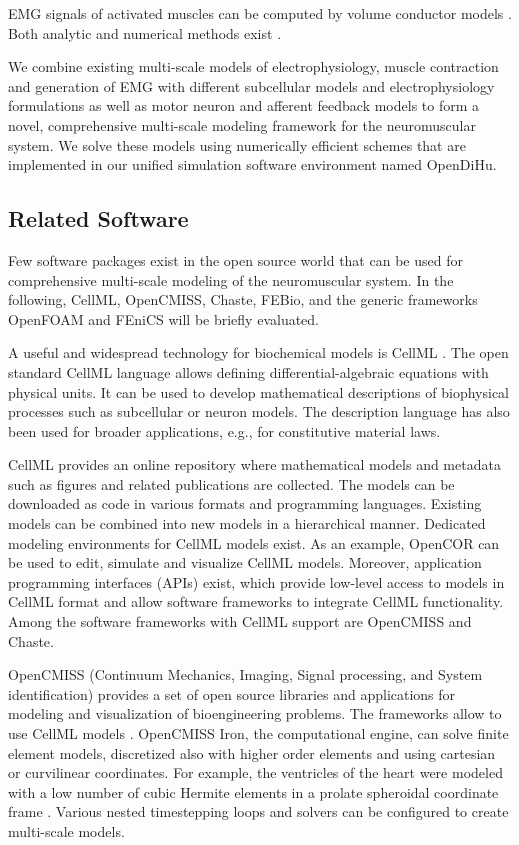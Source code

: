 EMG signals of activated muscles can be computed by volume conductor models \cite{Mesin2013}. Both 
 analytic \cite{Dimitrov1998, Farina2001, Mesin2006} and numerical methods exist \cite{Lowery2002, Mordhorst2015, Mordhorst2017, Klotz2020}.

We combine existing multi-scale models of electrophysiology, muscle contraction and generation of EMG with different subcellular models and electrophysiology formulations as well as motor neuron and afferent feedback models to form a novel, comprehensive multi-scale modeling framework for the neuromuscular system. We solve these models using numerically efficient schemes that are implemented in our unified simulation software environment named OpenDiHu.
 
\subsection{Related Software}\label{sec:intro_related_software}
Few software packages exist in the open source world that can be used for comprehensive multi-scale modeling of the neuromuscular system. In the following, CellML, OpenCMISS, Chaste, FEBio, and the generic frameworks OpenFOAM and FEniCS will be briefly evaluated.

A useful and widespread technology for biochemical models is CellML \cite{Cellml2003,Lloyd2004}. The open standard CellML language allows defining differential-algebraic equations with physical units. It can be used to develop mathematical descriptions of biophysical processes such as subcellular or neuron models. The description language has also been used for broader applications, e.g., for constitutive material laws. 

CellML provides an online repository where mathematical models and metadata such as figures and related publications are collected. The models can be downloaded as code in various formats and programming languages. Existing models can be combined into new models in a hierarchical manner. Dedicated modeling environments for CellML models exist. As an example, OpenCOR \cite{OpenCOR2015} can be used to edit, simulate and visualize CellML models. Moreover, application programming interfaces (APIs) exist, which provide low-level access to models in CellML format and allow software frameworks to integrate CellML functionality.
Among the software frameworks with CellML support are OpenCMISS and Chaste.

OpenCMISS (Continuum Mechanics, Imaging, Signal processing, and System identification) \cite{Bradley2011} provides a set of open source libraries and applications for modeling and visualization of bioengineering problems. The frameworks allow to use CellML models \cite{Nickerson2014}.
OpenCMISS Iron, the computational engine, can solve finite element models, discretized also with higher order elements and using cartesian or curvilinear coordinates. For example, the ventricles of the heart were modeled with a low number of cubic Hermite elements in a prolate spheroidal coordinate frame \cite{smith2004multiscale}.
Various nested timestepping loops and solvers can be configured to create multi-scale models. 

